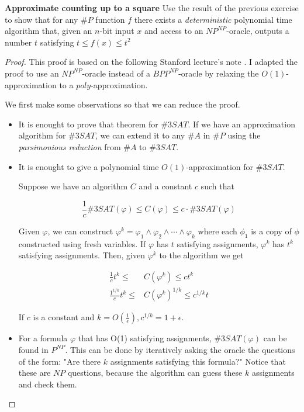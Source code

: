 \documentclass[12pt, a4paper]{article} %
\theoremstyle{definition}
\begin{document}
\textbf{Approximate counting up to a square} \quad Use the result of the previous exercise to show that for any $\#P$ function $f$ there exists a \textit{deterministic} polynomial time algorithm that, given an $n$-bit input $x$ and access to an $NP^{NP}$-oracle, outputs a number $t$ satisfying $t \leq f(x) \leq t^2$

\begin{proof}

  This proof is based on the following Stanford lecture's note \cite{lecture}. I adapted the proof to use an $NP^{NP}$-oracle instead of a $BPP^{NP}$-oracle by relaxing the $O(1)$-approximation to a $poly$-approximation.

  We first make some observations so that we can reduce the proof.

  \begin{itemize}
    \item It is enought to prove that theorem for $\#3SAT$. If we have an approximation algorithm for $\#3SAT$, we can extend it to any $\#A$ in $\#P$ using the \textit{parsimonious reduction} from $\#A$ to $\#3SAT$.
    \item It is enought to give a polynomial time $O(1)$-approximation for $\#3SAT$.

          Suppose we have an algorithm $C$ and a constant $c$ such that

          \begin{equation}\label{eq:2}
            \frac{1}{c}\#3SAT(\varphi) \leq C(\varphi) \leq c \cdot \#3SAT(\varphi)
          \end{equation}

          Given $\varphi$, we can construct $\varphi^k = \varphi_1 \land \varphi_2 \land \cdots \land \varphi_k$ where each $\phi_1$ is a copy of $\phi$ constructed using fresh variables. If $\varphi$ has $t$ satisfying assignments, $\varphi^k$ has $t^k$ satisfying assignments. Then, given $\varphi^k$ to the algorithm we get

          \begin{align*}
            \frac{1}{c}t^k \leq &C(\varphi^k) \leq ct^k \\
            \frac{1^{1/k}}{c}t^k \leq &C(\varphi^k)^{1/k} \leq c^{1/k}t
          \end{align*}

          If $c$ is a constant and $k = O(\frac{1}{\epsilon}), c^{1/k} = 1 + \epsilon$.

        \item For a formula $\varphi$ that has O(1) satisfying assignments, $\#3SAT(\varphi)$ can be found in $P^{NP}$. This can be done by iteratively asking the oracle the questions of the form: "Are there $k$ assignments satisfying this formula?" Notice that these are $NP$ questions, because the algorithm can guess these $k$ assignments and check them.
  \end{itemize}


\end{proof}
\end{document}

